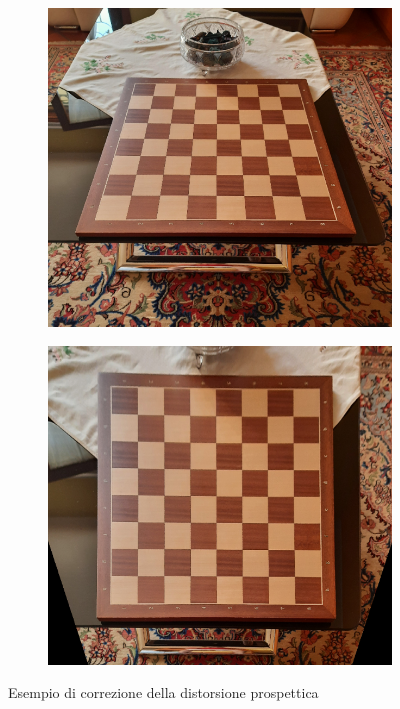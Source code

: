 \begin{figure}
    \centering
    \begin{subfigure}{.49\textwidth}
        \includegraphics[width=\textwidth]{images/persp1.png}
    \end{subfigure}
    \hfill
    \begin{subfigure}{.49\textwidth}
        \includegraphics[width=\textwidth]{images/persp2.png}
    \end{subfigure}
    \caption{Esempio di correzione della distorsione prospettica}
    \label{fig:projcorrected}
\end{figure}

